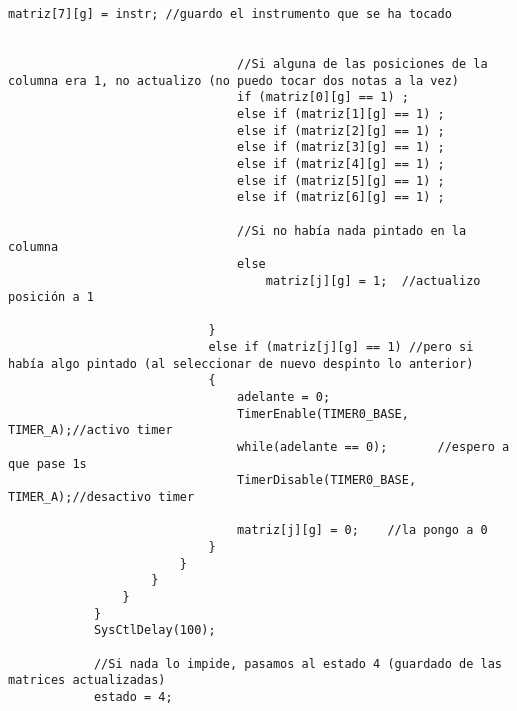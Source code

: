\documentclass[12pt,a4paper]{article}
\begin{document}
\begin{lstlisting}[basicstyle=\footnotesize]
                                matriz[7][g] = instr; //guardo el instrumento que se ha tocado


                                //Si alguna de las posiciones de la columna era 1, no actualizo (no puedo tocar dos notas a la vez)
                                if (matriz[0][g] == 1) ;
                                else if (matriz[1][g] == 1) ;
                                else if (matriz[2][g] == 1) ;
                                else if (matriz[3][g] == 1) ;
                                else if (matriz[4][g] == 1) ;
                                else if (matriz[5][g] == 1) ;
                                else if (matriz[6][g] == 1) ;

                                //Si no había nada pintado en la columna
                                else
                                    matriz[j][g] = 1;  //actualizo posición a 1

                            }
                            else if (matriz[j][g] == 1) //pero si había algo pintado (al seleccionar de nuevo despinto lo anterior)
                            {
                                adelante = 0;
                                TimerEnable(TIMER0_BASE, TIMER_A);//activo timer
                                while(adelante == 0);       //espero a que pase 1s
                                TimerDisable(TIMER0_BASE, TIMER_A);//desactivo timer

                                matriz[j][g] = 0;    //la pongo a 0
                            }
                        }
                    }
                }
            }
            SysCtlDelay(100);

            //Si nada lo impide, pasamos al estado 4 (guardado de las matrices actualizadas)
            estado = 4;

\end{lstlisting}
\end{document}
